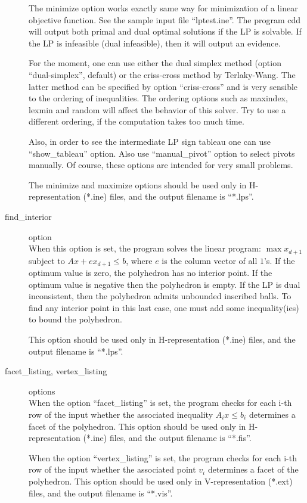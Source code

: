\documentclass[11pt]{article}
\begin{document}
\begin{description}
The minimize option works exactly same way for minimization of
a linear objective function.
See the sample input file ``lptest.ine''.  The program cdd
will output both primal and dual optimal solutions  if the LP
is solvable.  If the LP is infeasible (dual infeasible), then
it will output an evidence.

For the moment,  one can use either the dual simplex
method (option ``dual-simplex'', default) 
or the criss-cross method by Terlaky-Wang.  
The latter method can be specified
by option ``criss-cross'' and is very sensible to the ordering
of inequalities.  The ordering options such as maxindex, lexmin and 
random will affect the behavior of this solver.  Try to use
a different ordering, if the computation takes too much time.

Also, in order to see the intermediate LP sign tableau 
one can use ``show\_tableau'' option.  Also use ``manual\_pivot''
option to select pivots manually.   Of course, these options are 
intended for very small problems.

The minimize and maximize options should be used only in H-representation
(*.ine) files, and the output filename is ``*.lps''.

\item[find\_interior] option\\
When this option is set, the program solves the linear program: 
$\max x_{d+1}$
subject to $ A x + e x_{d+1} \le b$, where $e$ is the
column vector of all $1$'s.  If the optimum value is zero,
the polyhedron has no interior point.  If the optimum value is 
negative then the polyhedron is empty. If the LP is dual inconsistent,
then the polyhedron admits unbounded inscribed balls.  To find any
interior point in this last case, one must add some inequality(ies)
to bound the polyhedron. 

This option should be used only in H-representation
(*.ine) files, and the output filename is ``*.lps''.

\item[facet\_listing, vertex\_listing] options\\
When the option ``facet\_listing''  is set, the program checks for each i-th row of the input 
whether the associated inequality $A_i x \le b_i$ determines a facet
of the polyhedron.    This option should be used only in H-representation
(*.ine) files, and the output filename is ``*.fis''.

When the option ``vertex\_listing''  is set, the program checks for each i-th row of the input 
whether the associated point  $v_i$ determines a facet
of the polyhedron.    This option should be used only in V-representation
(*.ext) files, and the output filename is ``*.vis''.


\end{description}
\end{document}
